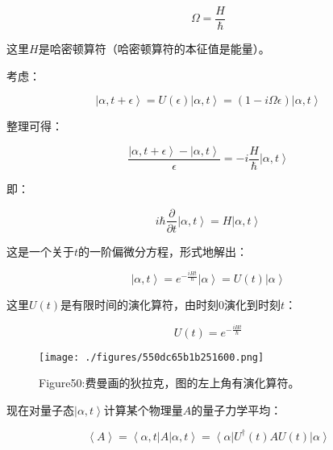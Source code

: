 \begin{equation}
\Omega = \frac{H}{\hbar}~
\end{equation}

这里$H$是哈密顿算符（哈密顿算符的本征值是能量）。

考虑：

\begin{equation}
\left| \alpha, t + \epsilon \right\rangle = U(\epsilon ) \left| \alpha, t \right\rangle = \left( 1- i \Omega \epsilon \right) \left| \alpha, t \right\rangle~
\end{equation}

整理可得：

\begin{equation}
\frac{ \left| \alpha, t + \epsilon \right\rangle - \left| \alpha, t \right\rangle }{\epsilon} = - i \frac{H }{\hbar} \left| \alpha, t \right\rangle~
\end{equation}

即：

\begin{equation}
i \hbar \frac{\partial }{\partial t} \left| \alpha, t \right\rangle = H \left| \alpha, t \right\rangle~
\end{equation}

这是一个关于$t$的一阶偏微分方程，形式地解出：

\begin{equation}
\left| \alpha , t \right\rangle = e^{- \frac{i H t}{\hbar}} \left| \alpha \right\rangle = U(t ) \left| \alpha \right\rangle~
\end{equation}

这里$U(t)$是有限时间的演化算符，由时刻$0$演化到时刻$t$：

\begin{equation}
U (t) = e^{- \frac{i H t}{\hbar}}~
\end{equation}

\begin{figure}[ht]
\centering
\texttt{[image: ./figures/550dc65b1b251600.png]}
\caption{Figure50:费曼画的狄拉克，图的左上角有演化算符。} \label{fig_QMPre4_2}
\end{figure}

现在对量子态$\left| \alpha, t \right\rangle$计算某个物理量$A$的量子力学平均：

\begin{equation}
\left\langle A \right\rangle = \left\langle \alpha, t \right| A \left| \alpha, t \right\rangle = \left\langle \alpha \right| U^\dagger(t) A U(t) \left| \alpha \right\rangle~
\end{equation}

